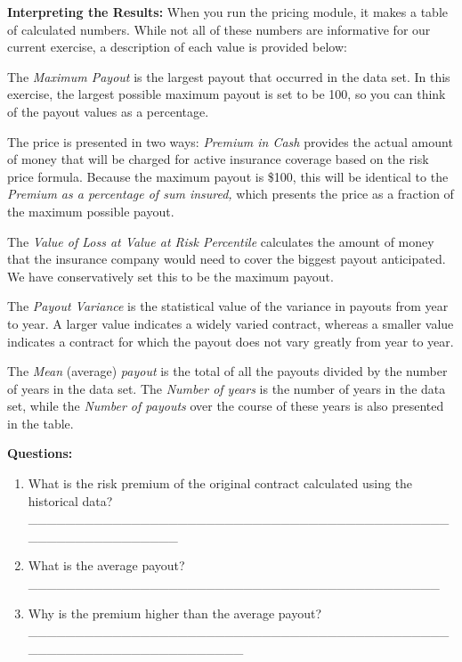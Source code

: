 \documentclass[letterpaper,10pt,english]{sphinxmanual}
\begin{document}
\textbf{Interpreting the Results:} When you run the pricing module, it makes a table of calculated numbers. While not all of these numbers are informative for our current exercise, a description of each value is provided below:

The \emph{Maximum Payout} is the largest payout that occurred in the data set. In this exercise, the largest possible maximum payout is set to be 100, so you can think of the payout values as a percentage.

The price is presented in two ways: \emph{Premium in Cash} provides the actual amount of money that will be charged for active insurance coverage based on the risk price formula. Because the maximum payout is \$100, this will be identical to the \emph{Premium as a percentage of sum insured,} which presents the price as a fraction of the maximum possible payout.

The \emph{Value of Loss at Value at Risk Percentile} calculates the amount of money that the insurance company would need to cover the biggest payout anticipated.  We have conservatively set this to be the maximum payout.

The \emph{Payout Variance} is the statistical value of the variance in payouts from year to year. A larger value indicates a widely varied contract, whereas a smaller value indicates a contract for which the payout does not vary greatly from year to year.

The \emph{Mean} (average) \emph{payout} is the total of all the payouts divided by the number of years in the data set. The \emph{Number of years} is the number of years in the data set, while the \emph{Number of payouts} over the course of these years is also presented in the table.

\textbf{Questions:}
\begin{enumerate}
\item {} 
What is the risk premium of the original contract calculated using the historical data?  \_\_\_\_\_\_\_\_\_\_\_\_\_\_\_\_\_\_\_\_\_\_\_\_\_\_\_\_\_\_\_\_\_\_\_\_\_\_\_\_\_\_\_\_\_\_\_\_\_\_\_\_\_\_\_\_\_\_\_\_\_

\item {} 
What is the average payout? \_\_\_\_\_\_\_\_\_\_\_\_\_\_\_\_\_\_\_\_\_\_\_\_\_\_\_\_\_\_\_\_\_\_\_\_\_\_\_\_\_\_\_\_

\item {} 
Why is the premium higher than the average payout? \_\_\_\_\_\_\_\_\_\_\_\_\_\_\_\_\_\_\_\_\_\_\_\_\_\_\_\_\_\_\_\_\_\_\_\_\_\_\_\_\_\_\_\_\_\_\_\_\_\_\_\_\_\_\_\_\_\_\_\_\_\_\_\_\_\_\_\_

\end{enumerate}
\end{document}
